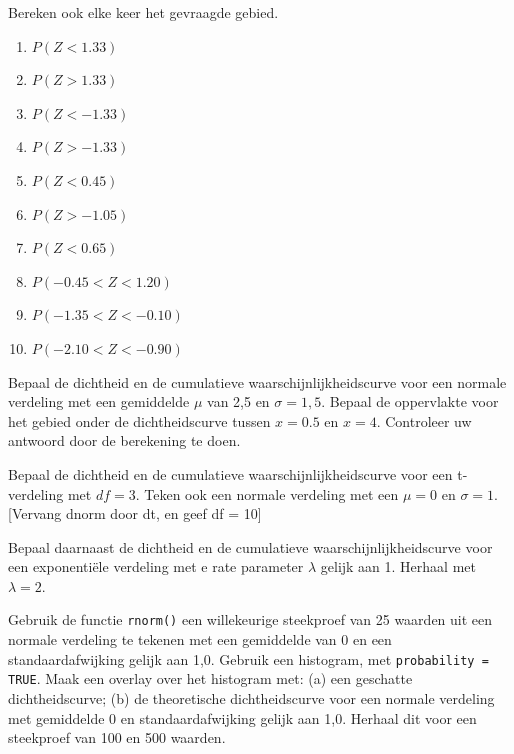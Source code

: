 {\begin{exercise}
  Bereken ook elke keer het gevraagde gebied.
  \begin{enumerate}[label=\alph*.]
    \item $P(Z < 1.33)$
    \item $P(Z > 1.33)$
    \item $P(Z < -1.33)$
    \item $P(Z > -1.33)$
    \item $P(Z < 0.45)$
    \item $P(Z > -1.05)$
    \item $P(Z < 0.65)$
    \item $P(-0.45 < Z < 1.20)$
    \item $P(-1.35 < Z < -0.10)$
    \item $P(-2.10 < Z < -0.90)$
  \end{enumerate}
\end{exercise}

\begin{exercise}
	Bepaal de dichtheid en de cumulatieve waarschijnlijkheidscurve voor een normale verdeling met een gemiddelde $\mu$
	van 2,5 en $\sigma = 1,5$. Bepaal de oppervlakte voor het gebied onder de dichtheidscurve tussen
	$x = 0.5$ en $x = 4$. Controleer uw antwoord door de berekening te doen.
\end{exercise}

\begin{exercise}
	Bepaal de dichtheid en de cumulatieve waarschijnlijkheidscurve voor een t-verdeling met $df = 3$. Teken ook een normale verdeling met een $\mu = 0$  en $\sigma = 1$.
	[Vervang dnorm door dt, en geef df = 10]

	Bepaal daarnaast de dichtheid en de cumulatieve waarschijnlijkheidscurve voor een exponentiële verdeling met e rate parameter $ \lambda$ gelijk aan 1. Herhaal met $\lambda = 2$.
\end{exercise}

\begin{exercise}
    Gebruik de functie \verb|rnorm()| een willekeurige steekproef van 25 waarden uit een normale verdeling te tekenen met
een gemiddelde van 0 en een standaardafwijking gelijk aan 1,0. Gebruik een histogram, met \verb|probability = TRUE|.
Maak een overlay over het histogram met: (a) een geschatte dichtheidscurve; (b) de theoretische
dichtheidscurve voor een normale verdeling met gemiddelde 0 en standaardafwijking gelijk aan 1,0. Herhaal dit voor een steekproef van 100 en 500 waarden.
\end{exercise}

}
